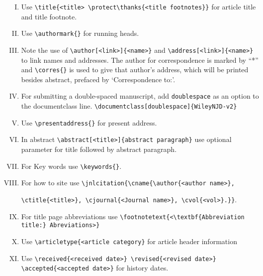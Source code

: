 \documentclass[AMS,STIX1COL]{WileyNJD-v2}
\begin{document}
\begin{enumerate}[(I).]

\item Use \verb"\title{<title> \protect\thanks{<title footnotes}}" for article title and title footnote.
\item Use \verb"\authormark{}" for running heads.

\item Note the use of \verb"\author[<link>]{<name>}" and \verb"\address[<link>]{<name>}" to
link names and addresses. The author for correspondence is marked
by ``*'' and \verb"\corres{}" is used to give that
author's address, which will be printed besides abstract, prefaced by
`Correspondence to:'.

\item For submitting a double-spaced manuscript, add
\verb"doublespace" as an option to the documentclass line. \verb"\documentclass[doublespace]{WileyNJD-v2}"

\item Use \verb"\presentaddress{}" for present address.

\item In abstract \verb"\abstract[<title>]{abstract paragraph}" use optional parameter for title followed by abstract paragraph.

\item For Key words use \verb"\keywords{}".

\item For how to site use \verb"\jnlcitation{\cname{\author{<author name>},"

\verb"\ctitle{<title>}, \cjournal{<Journal name>}, \cvol{<vol>}.}}".

\item For title page abbreviations use \verb"\footnotetext{<\textbf{Abbreviation title:} Abreviations>}"

\item Use \verb"\articletype{<article category}" for article header information

\item Use \verb"\received{<received date>} \revised{<revised date>} \accepted{<accepted date>}" for history dates.

\end{enumerate}
\end{document}
